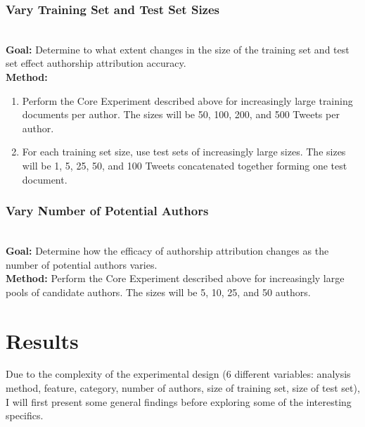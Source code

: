 \documentclass[pageno]{jpaper}
\begin{document}
\subsubsection{Vary Training Set and Test Set Sizes}
\label{sec:varyTrainingAndTest}
\indent
\\
\textbf{Goal:} Determine to what extent changes in the size of the training set and test set effect authorship attribution accuracy.
\\
\textbf{Method:} 
\begin{enumerate}
\item{Perform the Core Experiment described above for increasingly large training documents per author.  The sizes will be 50, 100, 200, and 500 Tweets per author.}
\item{For each training set size, use test sets of increasingly large sizes.  The sizes will be 1, 5, 25, 50, and 100 Tweets concatenated together forming one test document.}
\end{enumerate} 
\subsubsection{Vary Number of Potential Authors} 
\label{sec:varyAuthors}
\indent
\\
\textbf{Goal:} Determine how the efficacy of authorship attribution changes as the number of potential authors varies.
\\
\textbf{Method:} Perform the Core Experiment described above for increasingly large pools of candidate authors.  The sizes will be 5, 10, 25, and 50 authors.

\section{Results}
\label{sec:results}
Due to the complexity of the experimental design (6 different variables: analysis method, feature, category, number of authors, size of training set, size of test set), I will first present some general findings before exploring some of the interesting specifics.
\end{document}
